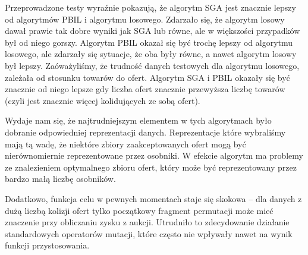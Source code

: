 Przeprowadzone testy wyraźnie pokazują, że algorytm SGA jest znacznie lepszy od algorytmów PBIL i algorytmu losowego.
Zdarzało się, że algorytm losowy dawał prawie tak dobre wyniki jak SGA lub równe, ale w większości przypadków był od niego gorszy.
Algorytm PBIL okazał się być trochę lepszy od algorytmu losowego, ale zdarzały się sytuacje, że oba były równe, a nawet algorytm losowy był lepszy.
Zaóważyliśmy, że trudność danych testowych dla algorytmu losowego, zależała od stosunku towarów do ofert.
Algorytm SGA i PBIL okazały się być znacznie od niego lepsze gdy liczba ofert znacznie przewyższa liczbę towarów (czyli jest znacznie więcej kolidujących ze sobą ofert).


Wydaje nam się, że najtrudniejszym  elementem w tych algorytmach było dobranie odpowiedniej reprezentacji danych.
Reprezentacje które wybraliśmy mają tą wadę, że niektóre zbiory zaakceptowanych ofert mogą być nierównomiernie reprezentowane przez osobniki.
W efekcie algorytm ma problemy ze znalezieniem optymalnego zbioru ofert, który może być reprezentowany przez bardzo małą liczbę osobników.


Dodatkowo, funkcja celu w pewnych momentach staje się skokowa -- dla danych z dużą liczbą kolizji ofert tylko początkowy fragment permutacji może mieć znaczenie przy obliczaniu zysku z aukcji. Utrudniło to zdecydowanie działanie standardowych operatorów mutacji, które często nie wpływały nawet na wynik funkcji przystosowania.
